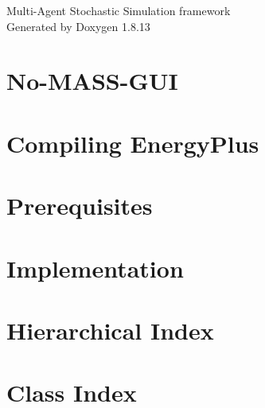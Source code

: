 \documentclass[twoside]{book}
\newcommand{\+}{\discretionary{\mbox{\scriptsize$\hookleftarrow$}}{}{}}
\newcommand{\clearemptydoublepage}{%
  \newpage{\pagestyle{empty}\cleardoublepage}%
}
\begin{document}
\hypersetup{pageanchor=false,
             bookmarksnumbered=true,
             pdfencoding=unicode
            }
\begin{titlepage}
\vspace*{7cm}
\begin{center}%
{\Large Multi-\/\+Agent Stochastic Simulation framework }\\
\vspace*{1cm}
{\large Generated by Doxygen 1.8.13}\\
\end{center}
\end{titlepage}
\clearemptydoublepage
{}
\tableofcontents
\clearemptydoublepage
{}
\hypersetup{pageanchor=true}

\chapter{No-\/\+M\+A\+S\+S-\/\+G\+UI}
\label{index}\hypertarget{index}{}
\chapter{Compiling Energy\+Plus}
\label{_compiling_energy_plus}

\chapter{Prerequisites}
\label{_prerequisites}

\chapter{Implementation}
\label{_implementation}

\chapter{Hierarchical Index}

\chapter{Class Index}

\end{document}
